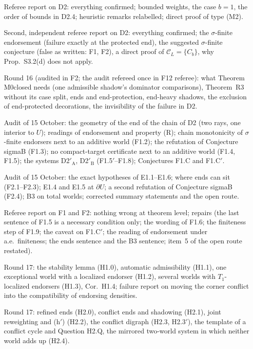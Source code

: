 \documentclass[11pt]{article}
\theoremstyle{definition}
\theoremstyle{remark}
\newcommand{\C}{\mathcal C}
\begin{document}
\begin{description}[leftmargin=*,font=\normalfont\ttfamily,style=nextline]
\item[D2\_referee.md] Referee report on D2: everything confirmed; bounded weights, the case $b=1$, the order of bounds in D2.4; heuristic remarks relabelled; direct proof of type (M2).
\item[D2\_referee2.md] Second, independent referee report on D2: everything confirmed; the $\sigma$-finite endorsement (failure exactly at the protected end), the suggested $\sigma$-finite conjecture (false as written: F1, F2), a direct proof of $\C_L=\{C_b\}$, why Prop.~S3.2(d) does not apply.
\item[E1\_notes.md] Round 16 (audited in F2; the audit refereed once in F12 referee): what Theorem M0closed needs (one admissible shadow's dominator comparisons), Theorem~R3 without its case split, ends and end-protection, end-heavy shadows, the exclusion of end-protected decorations, the invisibility of the failure in D2.
\item[F1\_notes.md] Audit of 15 October: the geometry of the end of the chain of D2 (two rays, one interior to $U$); readings of endorsement and property (R); chain monotonicity of $\sigma$-finite endorsers next to an additive world (F1.2); the refutation of Conjecture sigmaB (F1.3); no compact-target certificate next to an additive world (F1.4, F1.5); the systems D2$'_{\mathrm A}$, D2$'_{\mathrm B}$ (F1.5$'$--F1.8); Conjectures F1.C and F1.C$'$.
\item[F2\_notes.md] Audit of 15 October: the exact hypotheses of E1.1--E1.6; where ends can sit (F2.1--F2.3); E1.4 and E1.5 at $\partial U$; a second refutation of Conjecture sigmaB (F2.4); B3 on total worlds; corrected summary statements and the open route.
\item[F12\_referee.md] Referee report on F1 and F2: nothing wrong at theorem level; repairs (the last sentence of F1.5 is a necessary condition only; the wording of F1.6; the finiteness step of F1.9; the caveat on F1.C$'$; the reading of endorsement under a.e.\ finiteness; the ends sentence and the B3 sentence; item~5 of the open route restated).
\item[H1\_notes.md] Round 17: the stability lemma (H1.0), automatic admissibility (H1.1), one exceptional world with a localized endorser (H1.2), several worlds with $T_1$-localized endorsers (H1.3), Cor.~H1.4; failure report on moving the corner conflict into the compatibility of endorsing densities.
\item[H2\_notes.md] Round 17: refined ends (H2.0), conflict ends and shadowing (H2.1), joint reweighting and (h$'$) (H2.2), the conflict digraph (H2.3, H2.3$'$), the template of a conflict cycle and Question H2.Q, the mirrored two-world system in which neither world adds up (H2.4).

\end{description}
\end{document}
